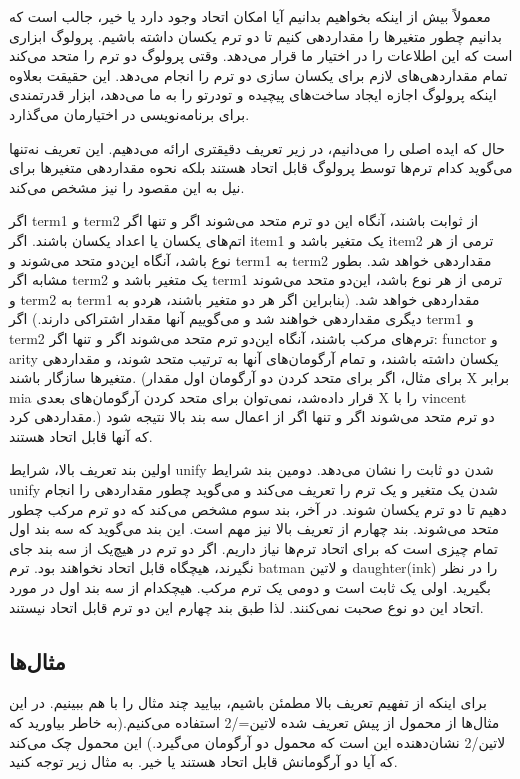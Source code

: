 معمولاً بیش از اینکه بخواهیم بدانیم آیا امکان اتحاد وجود دارد یا خیر، جالب است که بدانیم چطور متغیرها را مقداردهی کنیم تا دو ترم یکسان داشته باشیم. پرولوگ ابزاری است که این اطلاعات را در اختیار ما قرار می‌دهد. وقتی پرولوگ دو ترم را متحد می‌کند تمام مقداردهی‌های لازم برای یکسان سازی دو ترم را انجام می‌دهد. این حقیقت بعلاوه اینکه پرولوگ اجازه ایجاد ساخت‌های پیچیده و تودرتو را به ما می‌دهد، ابزار قدرتمندی برای برنامه‌نویسی در اختیارمان می‌گذارد.

حال که ایده اصلی را می‌دانیم، در زیر تعریف دقیقتری ارائه می‌دهیم. این تعریف نه‌تنها می‌گوید کدام ترم‌ها توسط پرولوگ قابل اتحاد هستند بلکه نحوه مقداردهی متغیرها برای نیل به این مقصود را نیز مشخص می‌کند.

 اگر term1 و term2 از ثوابت باشند، آنگاه این دو ترم متحد می‌شوند اگر و تنها اگر اتم‌های یکسان یا اعداد یکسان باشند.
 اگر item1 یک متغیر باشد و item2 ترمی از هر نوع باشد، آنگاه این‌دو متحد می‌شوند و term1 به term2 مقداردهی خواهد شد. بطور مشابه اگر term2 یک متغیر باشد و term1 ترمی از هر نوع باشد، این‌دو متحد می‌شوند و term2 به term1 مقداردهی خواهد شد. (بنابراین اگر هر دو متغیر باشند، هردو به دیگری مقداردهی خواهند شد و می‌گوییم آنها مقدار اشتراکی دارند.)
 اگر term1 و term2 ترم‌های مرکب باشند، آنگاه این‌دو ترم متحد می‌شوند اگر و تنها اگر:
 functor و arity یکسان داشته باشند، و
 تمام آرگومان‌های آنها به ترتیب متحد شوند، و
 مقداردهی متغیرها سازگار باشند. (برای مثال، اگر برای متحد کردن دو آرگومان اول مقدار X برابر mia قرار داده‌شد، نمی‌توان برای متحد کردن آرگومان‌های بعدی X را با vincent مقداردهی کرد.)
 دو ترم متحد می‌شوند اگر و تنها اگر از اعمال سه بند بالا نتیجه شود که آنها قابل اتحاد هستند.

اولین بند تعریف بالا، شرایط unify‌ شدن دو ثابت را نشان می‌دهد. دومین بند شرایط unify شدن یک متغیر و یک ترم را تعریف می‌کند و می‌گوید چطور مقداردهی را انجام دهیم تا دو ترم یکسان شوند. در آخر، بند سوم مشخص می‌کند که دو ترم مرکب چطور متحد می‌شوند. بند چهارم از تعریف بالا نیز مهم است. این بند می‌گوید که سه بند اول تمام چیزی است که برای اتحاد ترم‌ها نیاز داریم. اگر دو ترم در هیچ‌یک از سه بند جای نگیرند، هیچگاه قابل اتحاد نخواهند بود. ترم batman و ‌لاتین{ daughter(ink)} را در نظر بگیرید. اولی یک ثابت است و دومی یک ترم مرکب. هیچکدام از سه بند اول در مورد اتحاد این دو نوع صحبت نمی‌کنند. لذا طبق بند چهارم این دو ترم قابل اتحاد نیستند.

\subsection{مثال‌ها}
برای اینکه از تفهیم تعریف بالا مطمئن باشیم، بیایید چند مثال را با هم ببینیم. در این مثال‌ها از محمول از پیش تعریف شده ‌لاتین{=/2} استفاده می‌کنیم.(به خاطر بیاورید که ‌لاتین{/2} نشان‌دهنده این است که محمول دو آرگومان می‌گیرد.) این محمول چک می‌کند که آیا دو آرگومانش قابل اتحاد هستند یا خیر. به مثال زیر توجه کنید.

